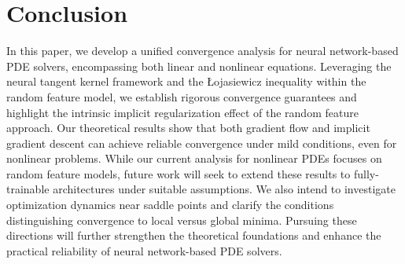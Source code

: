 \documentclass{article}
\begin{document}
\section{Conclusion} \label{sec:conclusion}
In this paper, we develop a unified convergence analysis for neural network-based PDE solvers, encompassing both linear and nonlinear equations. 
Leveraging the neural tangent kernel framework and the \L{}ojasiewicz inequality within the random feature model, we establish rigorous convergence guarantees and highlight the intrinsic implicit regularization effect of the random feature approach. 
Our theoretical results show that both gradient flow and implicit gradient descent can achieve reliable convergence under mild conditions, even for nonlinear problems.
While our current analysis for nonlinear PDEs focuses on random feature models, future work will seek to extend these results to fully-trainable architectures under suitable assumptions. 
We also intend to investigate optimization dynamics near saddle points and clarify the conditions distinguishing convergence to local versus global minima. 
Pursuing these directions will further strengthen the theoretical foundations and enhance the practical reliability of neural network-based PDE solvers.




\appendix
\end{document}
